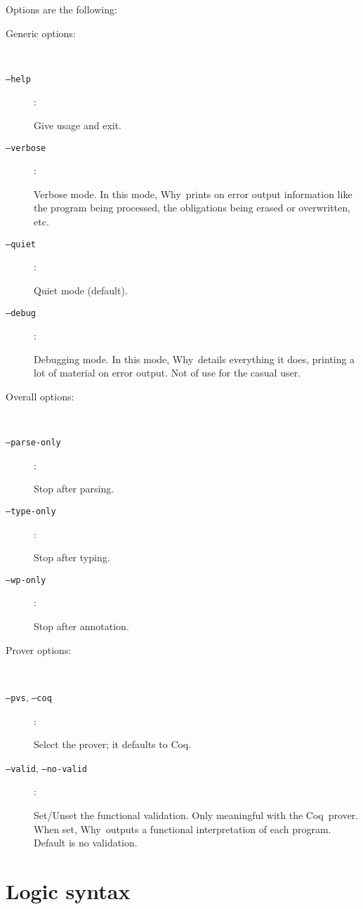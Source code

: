 \documentclass[a4paper,12pt]{report}
\newcommand{\coq}{\textsf{Coq}}
\newcommand{\why}{\textsf{Why}}
\begin{document}
Options are the following:
\begin{description}
  \item[Generic options:] ~\par
  \item[\texttt{--help}]: ~\par    
    Give usage and exit. 
  \item[\texttt{--verbose}]: ~\par 
    Verbose mode. In this mode, \why\ prints on error output
    information like the program being processed, the obligations
    being erased or overwritten, etc.
  \item[\texttt{--quiet}]: ~\par  
    Quiet mode (default).
  \item[\texttt{--debug}]: ~\par 
    Debugging mode. In this mode, \why\ details everything it does,
    printing a lot of material on error output. Not of use for the
    casual user.

  \item[Overall options:] ~\par
  \item[\texttt{--parse-only}]: ~\par  
    Stop after parsing.
  \item[\texttt{--type-only}]:  ~\par  
    Stop after typing.
  \item[\texttt{--wp-only}]:    ~\par  
    Stop after annotation.

  \item[Prover options:] ~\par
  \item[\texttt{--pvs}, \texttt{--coq}]: ~\par 
    Select the prover; it defaults to \coq.
  \item[\texttt{--valid}, \texttt{--no-valid}]: ~\par
    Set/Unset the functional validation. Only meaningful with the
    \coq\ prover. When set, \why\ outputs a functional interpretation
    of each program. Default is no validation. 
\end{description}


\section{Logic syntax}
\label{syntax:logic}
\end{document}
